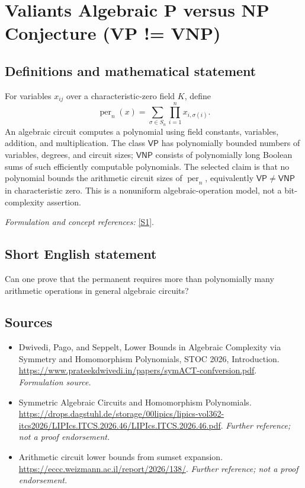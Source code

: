 \documentclass[11pt]{article}
\begin{document}
\section*{\texorpdfstring{Valiants Algebraic P versus NP Conjecture (VP != VNP)}{Valiants Algebraic P versus NP Conjecture (VP != VNP)}}\label{32}
\subsection{Definitions and mathematical statement}
For variables $x_{ij}$ over a characteristic-zero field $K$, define
\[
 \operatorname{per}_n(x)=\sum_{\sigma\in S_n}\prod_{i=1}^n x_{i,\sigma(i)}.
\]
An algebraic circuit computes a polynomial using field constants, variables, addition, and multiplication. The class $\mathsf{VP}$ has polynomially bounded numbers of variables, degrees, and circuit sizes; $\mathsf{VNP}$ consists of polynomially long Boolean sums of such efficiently computable polynomials. The selected claim is that no polynomial bounds the arithmetic circuit sizes of $\operatorname{per}_n$, equivalently $\mathsf{VP}\ne\mathsf{VNP}$ in characteristic zero. This is a nonuniform algebraic-operation model, not a bit-complexity assertion.
\par\smallskip\textit{Formulation and concept references:} \href{https://www.prateekdwivedi.in/papers/symACT-confversion.pdf}{[S1]}.

\subsection{Short English statement}
Can one prove that the permanent requires more than polynomially many arithmetic operations in general algebraic circuits?
\subsection{Sources}
\begin{itemize}
\item[S1]Dwivedi, Pago, and Seppelt, Lower Bounds in Algebraic Complexity via Symmetry and Homomorphism Polynomials, STOC 2026, Introduction.
\url{https://www.prateekdwivedi.in/papers/symACT-confversion.pdf}.
\textit{Formulation source.}
\item[S2]Symmetric Algebraic Circuits and Homomorphism Polynomials.
\url{https://drops.dagstuhl.de/storage/00lipics/lipics-vol362-itcs2026/LIPIcs.ITCS.2026.46/LIPIcs.ITCS.2026.46.pdf}.
\textit{Further reference; not a proof endorsement.}
\item[S3]Arithmetic circuit lower bounds from sumset expansion.
\url{https://eccc.weizmann.ac.il/report/2026/138/}.
\textit{Further reference; not a proof endorsement.}
\end{itemize}
\end{document}
